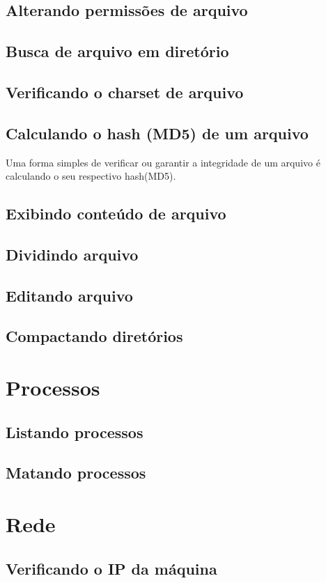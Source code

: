 \documentclass[a4paper,8pt]{extarticle}
\begin{document}
\begin{multicols}{2}
\subsection{Alterando permissões de arquivo}
\subsection{Busca de arquivo em diretório}
\subsection{Verificando o charset de arquivo}
\subsection{Calculando o hash (MD5) de um arquivo}
Uma forma simples de verificar ou garantir a integridade de um arquivo é
calculando o seu respectivo hash(MD5).
\subsection{Exibindo conteúdo de arquivo}
\subsection{Dividindo arquivo}
\subsection{Editando arquivo}
\subsection{Compactando diretórios}


\section{Processos}
\subsection{Listando processos}
\subsection{Matando processos}

%
\section{Rede}
\subsection{Verificando o IP da máquina}

\end{multicols}
\end{document}
